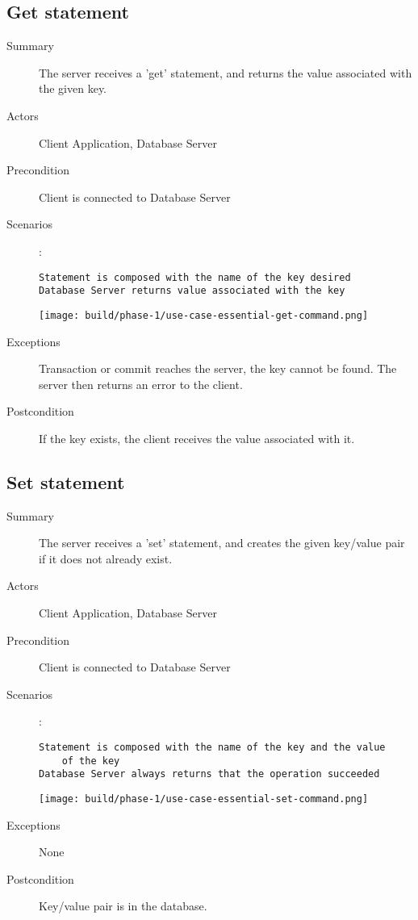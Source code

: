 \documentclass[a4paper]{report}
\begin{document}
	\pagebreak
	
	\subsection{Get statement}

	\begin{description}
		\item[Summary] The server receives a 'get' statement, and returns the value associated with the given key.
		\item[Actors] Client Application, Database Server
		\item[Precondition] Client is connected to Database Server
		\item[Scenarios] :

		\begin{lstlisting}
Statement is composed with the name of the key desired
Database Server returns value associated with the key
		\end{lstlisting}

		\begin{center}
			\texttt{[image: build/phase-1/use-case-essential-get-command.png]}
		\end{center}

		\item[Exceptions] Transaction or commit reaches the server, the key cannot be found. The server then returns an error to the client.

		\item[Postcondition] If the key exists, the client receives the value associated with it.
	\end{description}

	\pagebreak
	
	\subsection{Set statement}

	\begin{description}
		\item[Summary] The server receives a 'set' statement, and creates the given key/value pair if it does not already exist.
		\item[Actors] Client Application, Database Server
		\item[Precondition] Client is connected to Database Server
		\item[Scenarios] :

		\begin{lstlisting}
Statement is composed with the name of the key and the value
	of the key
Database Server always returns that the operation succeeded
		\end{lstlisting}

		\begin{center}
			\texttt{[image: build/phase-1/use-case-essential-set-command.png]}
		\end{center}

		\item[Exceptions] None
		\item[Postcondition] Key/value pair is in the database.
	\end{description}
	
\end{document}
